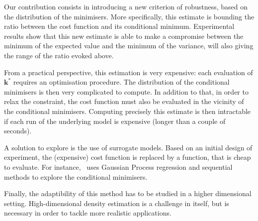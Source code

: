 \documentclass[preprint, 1p]{elsarticle}
\begin{document}
Our contribution consists in introducing a new criterion of robustness, based on the distribution of the minimisers. More specifically, this estimate is bounding the ratio between the cost function and its conditional minimum.
Experimental results show that this new estimate is able to make a compromise between the minimum of the expected value and the minimum of the variance, will also giving the range of the ratio evoked above.

From a practical perspective, this estimation is very expensive: each evaluation of $\mathbf{k}^*$ requires an optimisation procedure. The distribution of the conditional minimisers is then very complicated to compute.
In addition to that, in order to relax the constraint, the cost function must also be evaluated in the vicinity of the conditional minimisers. Computing precisely this estimate is then intractable if each run of the underlying model is expensive (longer than a couple of seconds).


A solution to explore is the use of surrogate models. Based on an initial design of experiment, the (expensive) cost function is replaced by a function, that is cheap to evaluate.
For instance,~\cite{ginsbourger_bayesian_2014}
uses Gaussian Process regression and sequential methods to explore the conditional minimisers.

Finally, the adaptibility of this method has to be studied in a higher dimensional setting. High-dimensional density estimation is a challenge in itself, but is necessary in order to tackle more realistic applications.


 

\end{document}

